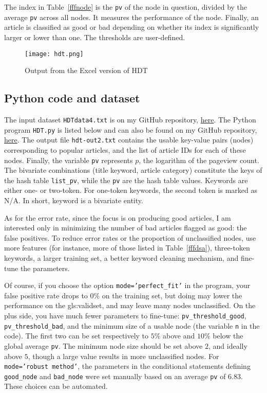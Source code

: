 \documentclass[oneside,10pt]{book}
\begin{document}
The index in Table~\ref{fffnode} is the \texttt{pv} of the node in question, divided by the average \texttt{pv} across all nodes. It measures the performance of the node. Finally, an article is classified as good or bad depending on whether its index is significantly larger or lower than one. The thresholds are user-defined. 


\begin{figure}%
\centering
\texttt{[image: hdt.png]}
\caption{Output from the Excel version of HDT}
\label{fig:hdt}
\end{figure}



\subsection{Python code and dataset}\label{pythourew}


The input dataset \texttt{HDTdata4.txt} is on my GitHub repository, \href{https://github.com/VincentGranville/Machine-Learning/blob/main/Source\%20Code/HDTdata4.txt}{here}. The Python program \texttt{HDT.py} is listed below and can also be found on my GitHub repository, \href{https://github.com/VincentGranville/Machine-Learning/blob/main/Source\%20Code/HDT.py}{here}. The output file \texttt{hdt-out2.txt} contains the usable key-value pairs (nodes) corresponding to popular articles, and the list of article IDs for each of these nodes. Finally, the variable \texttt{pv} represents $p$, the logarithm of the pageview count. The bivariate combinations (title keyword, article category)  constitute the
 keys of the hash table \texttt{list\_pv}, while the \texttt{pv} are the hash table values. Keywords are either one- or two-token. For one-token keywords, the second token is marked as N/A. In short, keyword is a bivariate entity.

As for the error rate, since the focus is on producing good articles, I am interested only in minimizing the number of bad articles flagged as good: the false positives.  To reduce error rates or the proportion of unclassified nodes, use more features (for instance, more of those listed in Table~\ref{fffdsa}), three-token keywords, a larger training set, a better keyword cleaning mechanism, and fine-tune the parameters. 

Of course, if you choose the option \texttt{mode='perfect\_fit'} in the program, your false positive rate drops to $0\%$ on the training set, but doing may lower the
 performance on the \gls{gls:validset}, and may leave many nodes unclassified.  On the plus side, you have much fewer parameters to fine-tune:
 \texttt{pv\_threshold\_good}, \texttt{pv\_threshold\_bad}, and the minimum size of a usable node (the variable \texttt{n} in the code). The first two can be set respectively to $5\%$ above and 
$10\%$ below 
 the global average \texttt{pv}. The minimum node size should be set above $2$, and ideally above $5$, though a large value results in more unclassified nodes.
 For \texttt{mode='robust method'}, the
 parameters in the conditional statements defining \texttt{good\_node} and \texttt{bad\_node} were set manually based on an average \texttt{pv} of $6.83$. These choices can be automated.
\end{document}
